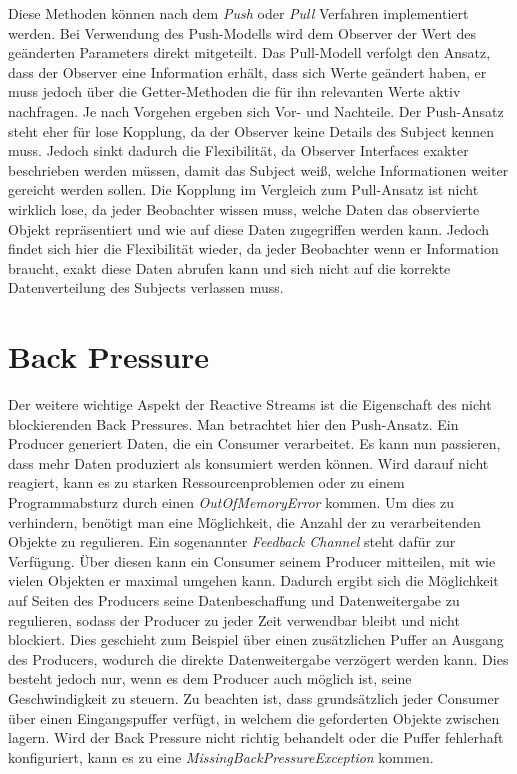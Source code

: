 Diese Methoden können nach dem \textit{Push} oder \textit{Pull} Verfahren implementiert werden. Bei Verwendung des Push-Modells wird dem Observer der Wert des geänderten Parameters direkt mitgeteilt. Das Pull-Modell verfolgt den Ansatz, dass der Observer eine Information erhält, dass sich Werte geändert haben, er muss jedoch über die Getter-Methoden die für ihn relevanten Werte aktiv nachfragen. Je nach Vorgehen ergeben sich Vor- und Nachteile. Der Push-Ansatz steht eher für lose Kopplung, da der Observer keine Details des Subject kennen muss. Jedoch sinkt dadurch die Flexibilität, da Observer Interfaces exakter beschrieben werden müssen, damit das Subject weiß, welche Informationen weiter gereicht werden sollen. Die Kopplung im Vergleich zum Pull-Ansatz ist nicht wirklich lose, da jeder Beobachter wissen muss, welche Daten das observierte Objekt repräsentiert und wie auf diese Daten zugegriffen werden kann. Jedoch findet sich hier die Flexibilität wieder, da jeder Beobachter wenn er Information braucht, exakt diese Daten abrufen kann und sich nicht auf die korrekte Datenverteilung des Subjects verlassen muss.
\section{Back Pressure}
Der weitere wichtige Aspekt der Reactive Streams ist die Eigenschaft des nicht blockierenden Back Pressures. Man betrachtet hier den Push-Ansatz. Ein Producer generiert Daten, die ein Consumer verarbeitet. Es kann nun passieren, dass mehr Daten produziert als konsumiert werden können. Wird darauf nicht reagiert, kann es zu starken Ressourcenproblemen oder zu einem Programmabsturz durch einen \textit{OutOfMemoryError} kommen. Um dies zu verhindern, benötigt man eine Möglichkeit, die Anzahl der zu verarbeitenden Objekte zu regulieren. Ein sogenannter \textit{Feedback Channel} steht dafür zur Verfügung. Über diesen kann ein Consumer seinem Producer mitteilen, mit wie vielen Objekten er maximal umgehen kann. Dadurch ergibt sich die Möglichkeit auf Seiten des Producers seine Datenbeschaffung und Datenweitergabe zu regulieren, sodass der Producer zu jeder Zeit verwendbar bleibt und nicht blockiert. Dies geschieht zum Beispiel über einen zusätzlichen Puffer an Ausgang des Producers, wodurch die direkte Datenweitergabe verzögert werden kann. Dies besteht jedoch nur, wenn es dem Producer auch möglich ist, seine Geschwindigkeit zu steuern. Zu beachten ist, dass grundsätzlich jeder Consumer über einen Eingangspuffer verfügt, in welchem die geforderten Objekte zwischen lagern. Wird der Back Pressure nicht richtig behandelt oder die Puffer fehlerhaft konfiguriert, kann es zu eine \textit{MissingBackPressureException} kommen.
